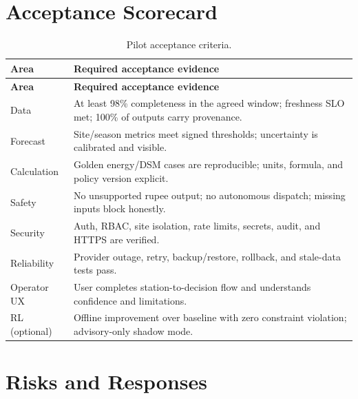 \documentclass[11pt,a4paper]{article}
\begin{document}
\section{Acceptance Scorecard}

\begin{longtable}{@{}p{2.8cm}p{11.7cm}@{}}
\caption{Pilot acceptance criteria.}\label{tab:acceptance}\\
\toprule
\textbf{Area} & \textbf{Required acceptance evidence}\\
\midrule
\endfirsthead
\toprule
\textbf{Area} & \textbf{Required acceptance evidence}\\
\midrule
\endhead
\bottomrule
\endfoot
Data & At least 98\% completeness in the agreed window; freshness SLO met;
100\% of outputs carry provenance.\\
Forecast & Site/season metrics meet signed thresholds; uncertainty is calibrated and visible.\\
Calculation & Golden energy/DSM cases are reproducible; units, formula, and policy version explicit.\\
Safety & No unsupported rupee output; no autonomous dispatch; missing inputs block honestly.\\
Security & Auth, RBAC, site isolation, rate limits, secrets, audit, and HTTPS are verified.\\
Reliability & Provider outage, retry, backup/restore, rollback, and stale-data tests pass.\\
Operator UX & User completes station-to-decision flow and understands confidence and limitations.\\
RL (optional) & Offline improvement over baseline with zero constraint violation;
advisory-only shadow mode.\\
\end{longtable}

\section{Risks and Responses}
\end{document}
